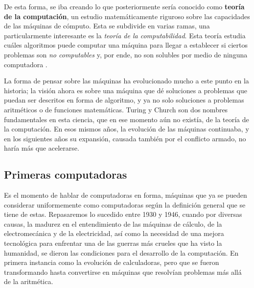 \documentclass[letterpaper,12pt,oneside]{book}
\begin{document}
        De esta forma, se iba creando lo que posteriormente sería conocido como \textbf{teoría de la computación}, un estudio  matemáticamente riguroso
		sobre las capacidades de las máquinas de cómputo. Esta se subdivide en varias ramas, una particularmente interesante es la \textit{teoría de la computabilidad}. Esta teoría estudia
		cuáles algoritmos puede computar una máquina para llegar a establecer si ciertos problemas son \textit{no computables} y, por ende, no son solubles por medio de ninguna computadora \cite[p. 272]{ifrah_universal_2001}.
		
		La forma de pensar sobre las máquinas ha evolucionado mucho a este punto en la historia; la visión ahora es sobre una máquina que dé soluciones a problemas que
		puedan ser descritos en forma de algoritmo, y ya no solo soluciones a problemas aritméticos o de funciones matemáticas. Turing y Church
		son dos nombres fundamentales en esta ciencia, que en ese momento aún no existía, de la teoría de la computación. En esos mismos años, la evolución
		de las máquinas continuaba, y en los siguientes años su expansión, causada también por el conflicto armado, no haría más que acelerarse.
		
		\clearpage		
		\subsection{Primeras computadoras}
		
		Es el momento de hablar de computadoras en forma, máquinas que ya se pueden considerar uniformemente como computadoras según la definición general
		que se tiene de estas. Repasaremos lo sucedido entre 1930 y 1946, cuando por diversas causas, la madurez en el entendimiento de las
		máquinas de cálculo, de la electromecánica y de la electricidad, así como la necesidad de una mejora tecnológica para enfrentar una de las guerras
		más crueles que ha visto la humanidad, se dieron las condiciones para el desarrollo de la computación. En primera instancia
		como la evolución de calculadoras, pero que se fueron transformando hasta convertirse en máquinas que resolvían problemas más allá de 
		la aritmética.
		
\end{document}

